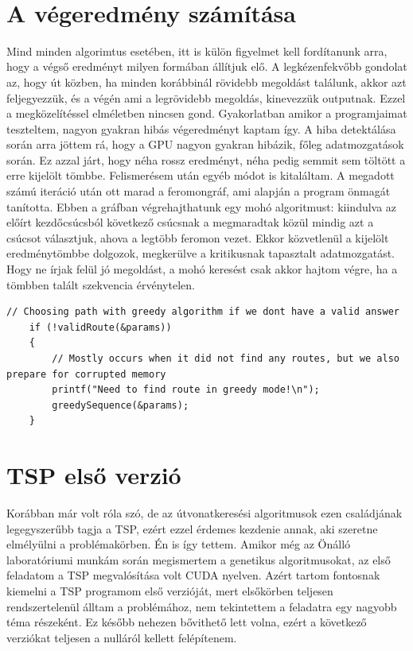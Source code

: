 \begin{lstlisting}[style=CStyle,showstringspaces=false]
	
\end{lstlisting}

\section{A végeredmény számítása}
\label{sec:getResult}
Mind minden algorimtus esetében, itt is külön figyelmet kell fordítanunk arra, hogy a végső eredményt milyen formában állítjuk elő. A legkézenfekvőbb gondolat az, hogy út közben, ha minden korábbinál rövidebb megoldást találunk, akkor azt feljegyezzük, és a végén ami a legrövidebb megoldás, kinevezzük outputnak. Ezzel a megközelítéssel elméletben nincsen gond. Gyakorlatban amikor a programjaimat teszteltem, nagyon gyakran hibás végeredményt kaptam így. A hiba detektálása során arra jöttem rá, hogy a GPU nagyon gyakran hibázik, főleg adatmozgatások során. Ez azzal járt, hogy néha rossz eredményt, néha pedig semmit sem töltött a erre kijelölt tömbbe. Felismerésem után egyéb módot is kitaláltam. A megadott számú iteráció után ott marad a feromongráf, ami alapján a program önmagát tanította. Ebben a gráfban végrehajthatunk egy mohó algoritmust: kiindulva az előírt kezdőcsúcsból következő csúcsnak a megmaradtak közül mindig azt a csúcsot választjuk, ahova a legtöbb feromon vezet. Ekkor közvetlenül a kijelölt eredménytömbbe dolgozok, megkerülve a kritikusnak tapasztalt adatmozgatást. Hogy ne írjak felül jó megoldást, a mohó keresést csak akkor hajtom végre, ha a tömbben talált szekvencia érvénytelen.

\begin{lstlisting}[style=CStyle,showstringspaces=false]
	// Choosing path with greedy algorithm if we dont have a valid answer
	if (!validRoute(&params)) 
	{
		// Mostly occurs when it did not find any routes, but we also prepare for corrupted memory
		printf("Need to find route in greedy mode!\n");
		greedySequence(&params);
	}
\end{lstlisting}


\section{TSP első verzió} \label{TSP_v1_SubSection}
Korábban már volt róla szó, de az útvonatkeresési algoritmusok ezen családjának legegyszerűbb tagja a TSP, ezért ezzel érdemes kezdenie annak, aki szeretne elmélyülni a problémakörben. Én is így tettem. Amikor még az Önálló laboratóriumi munkám során megismertem a genetikus algoritmusokat, az első feladatom a TSP megvalósítása volt CUDA nyelven. Azért tartom fontosnak kiemelni a TSP programom első verzióját, mert elsőkörben teljesen rendszertelenül álltam a problémához, nem tekintettem a feladatra egy nagyobb téma részeként. Ez később nehezen bővithető lett volna, ezért a következő verziókat teljesen a nulláról kellett felépítenem.

